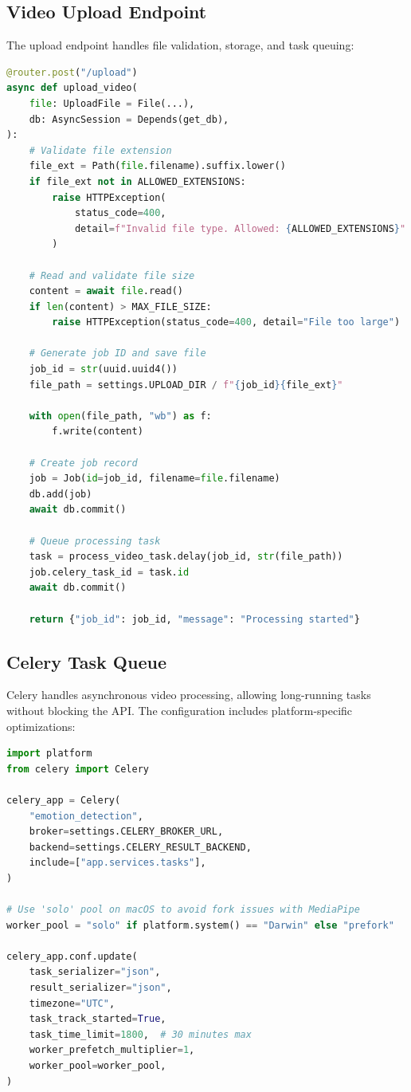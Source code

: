 \subsection{Video Upload Endpoint}

The upload endpoint handles file validation, storage, and task queuing:

\begin{lstlisting}[language=Python, caption={Video upload handler (app/api/videos.py)}]
@router.post("/upload")
async def upload_video(
    file: UploadFile = File(...),
    db: AsyncSession = Depends(get_db),
):
    # Validate file extension
    file_ext = Path(file.filename).suffix.lower()
    if file_ext not in ALLOWED_EXTENSIONS:
        raise HTTPException(
            status_code=400,
            detail=f"Invalid file type. Allowed: {ALLOWED_EXTENSIONS}"
        )

    # Read and validate file size
    content = await file.read()
    if len(content) > MAX_FILE_SIZE:
        raise HTTPException(status_code=400, detail="File too large")

    # Generate job ID and save file
    job_id = str(uuid.uuid4())
    file_path = settings.UPLOAD_DIR / f"{job_id}{file_ext}"

    with open(file_path, "wb") as f:
        f.write(content)

    # Create job record
    job = Job(id=job_id, filename=file.filename)
    db.add(job)
    await db.commit()

    # Queue processing task
    task = process_video_task.delay(job_id, str(file_path))
    job.celery_task_id = task.id
    await db.commit()

    return {"job_id": job_id, "message": "Processing started"}
\end{lstlisting}

\subsection{Celery Task Queue}

Celery handles asynchronous video processing, allowing long-running tasks without blocking the API. The configuration includes platform-specific optimizations:

\begin{lstlisting}[language=Python, caption={Celery configuration (app/core/celery\_app.py)}]
import platform
from celery import Celery

celery_app = Celery(
    "emotion_detection",
    broker=settings.CELERY_BROKER_URL,
    backend=settings.CELERY_RESULT_BACKEND,
    include=["app.services.tasks"],
)

# Use 'solo' pool on macOS to avoid fork issues with MediaPipe
worker_pool = "solo" if platform.system() == "Darwin" else "prefork"

celery_app.conf.update(
    task_serializer="json",
    result_serializer="json",
    timezone="UTC",
    task_track_started=True,
    task_time_limit=1800,  # 30 minutes max
    worker_prefetch_multiplier=1,
    worker_pool=worker_pool,
)
\end{lstlisting}

